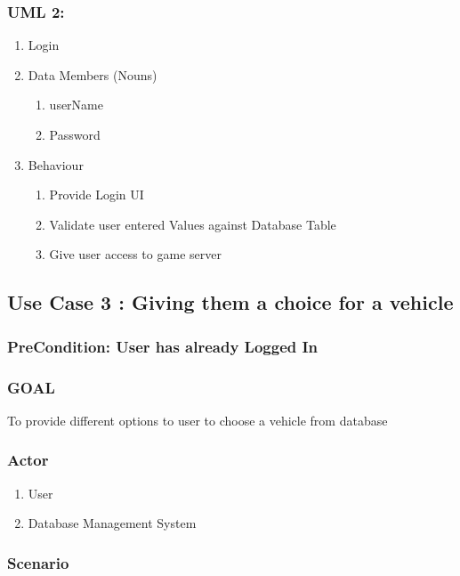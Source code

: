 \documentclass{article}
\begin{document}
\subsubsection{UML 2:}
\begin{enumerate}
    \item Login
    \item Data Members (Nouns)
          \begin{enumerate}
              \item userName
              \item Password
              
          \end{enumerate}
    \item Behaviour
        \begin{enumerate}
            \item Provide Login UI
            \item Validate user entered Values against Database Table
            \item Give user access to game server
        \end{enumerate}
\end{enumerate}

\subsection{Use Case 3 : Giving them a choice for a vehicle}
\subsubsection{PreCondition: User has already Logged In}

\subsubsection{GOAL}
To provide different options to user to choose a vehicle from database

\subsubsection{Actor}

\begin{enumerate}
    \item  User
    \item  Database Management System

\end{enumerate}
\subsubsection{Scenario}
\end{document}

